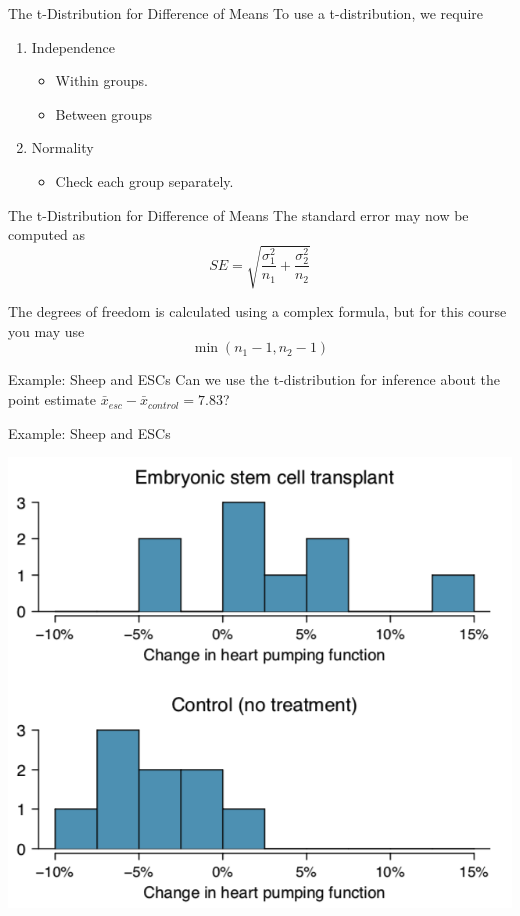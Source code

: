 \begin{frame}{The t-Distribution for Difference of Means}
    To use a t-distribution, we require
    \begin{enumerate}
        \item Independence
        \begin{itemize}
            \item Within groups.
            \item Between groups
        \end{itemize}
        \item Normality
        \begin{itemize}
            \item Check each group separately.
        \end{itemize}
    \end{enumerate}
\end{frame}

\begin{frame}{The t-Distribution for Difference of Means}
    The standard error may now be computed as
    \[
        SE = \sqrt{\frac{\sigma_1^2}{n_1} + \frac{\sigma_2^2}{n_2}}
    \]
    
    \vspace{12pt}The degrees of freedom is calculated using a complex formula, but for this course you may use
    \[
        \min(n_1-1, n_2-1)
    \]
\end{frame}

\begin{frame}{Example: Sheep and ESCs}
    Can we use the t-distribution for inference about the point estimate $\bar{x}_{esc} - \bar{x}_{control} = 7.83$?
\end{frame}

\begin{frame}{Example: Sheep and ESCs}
    \begin{center}
        \includegraphics[scale=0.3]{images/escsheep.png}
    \end{center}
\end{frame}

